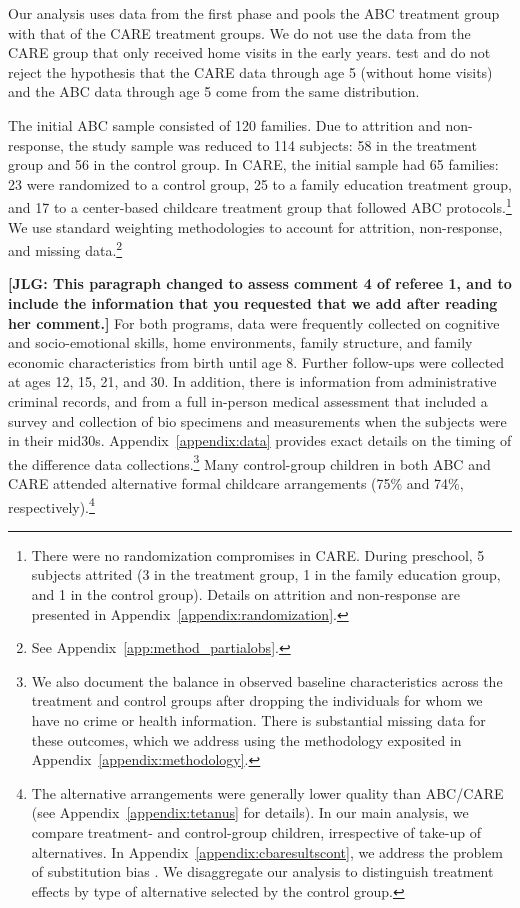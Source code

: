Our analysis uses data from the first phase and pools the ABC treatment group with that of the CARE treatment groups. We do not use the data from the CARE group that only received home visits in the early years. \cite{Campbell_Conti_etal_2014_EarlyChildhoodInvestments} test and do not reject the hypothesis that the CARE data through age 5 (without home visits) and the ABC data through age 5 come from the same distribution.

The initial ABC sample consisted of 120 families. Due to attrition and non-response, the study sample was reduced to 114 subjects: 58 in the treatment group and 56 in the control group. In CARE, the initial sample had 65 families: 23 were randomized to a control group, 25 to a family education treatment group, and 17 to a center-based childcare treatment group that followed ABC protocols.\footnote{There were no randomization compromises in CARE. During preschool, 5 subjects attrited (3 in the treatment group, 1 in the family education group, and 1 in the control group). Details on attrition and non-response are presented in Appendix~\ref{appendix:randomization}.} We use standard weighting methodologies to account for attrition, non-response, and missing data.\footnote{See Appendix~\ref{app:method_partialobs}.}

\textbf{[JLG: This paragraph changed to assess comment 4 of referee 1, and to include the information that you requested that we add after reading her comment.]} For both programs, data were frequently collected on cognitive and socio-emotional skills, home environments, family structure, and family economic characteristics from birth until age 8. Further follow-ups were collected at ages 12, 15, 21, and 30. In addition, there is information from administrative criminal records, and from a full in-person medical assessment that included a survey and collection of bio specimens and measurements when the subjects were in their mid30s. Appendix~\ref{appendix:data} provides exact details on the timing of the difference data collections.\footnote{We also document the balance in observed baseline characteristics across the treatment and control groups after dropping the individuals for whom we have no crime or health information. There is substantial missing data for these outcomes, which we address using the methodology exposited in Appendix~\ref{appendix:methodology}.} Many control-group children in both ABC and CARE attended alternative formal childcare arrangements (75\% and 74\%, respectively).\footnote{The alternative arrangements were generally lower quality than ABC/CARE (see Appendix~\ref{appendix:tetanus} for details). In our main analysis, we compare treatment- and control-group children, irrespective of take-up of alternatives. In Appendix~\ref{appendix:cbaresultscont}, we address the problem of substitution bias \citep{Heckman_1992_randomization,Heckman_Hohmann_etal_2000_QJE,Kline_Walters_2016_QJE}. We disaggregate our analysis to distinguish treatment effects by type of alternative selected by the control group.}

